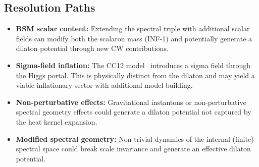 \documentclass[11pt,a4paper]{article}
\theoremstyle{plain}
\theoremstyle{definition}
\begin{document}
\subsection{Resolution Paths}

\begin{itemize}[nosep]
  \item \textbf{BSM scalar content:}
    Extending the spectral triple with additional scalar fields
    can modify both the scalaron mass (INF-1) and potentially
    generate a dilaton potential through new CW contributions.
  \item \textbf{Sigma-field inflation:}
    The CC12 model~\cite{CC12} introduces a sigma field through
    the Higgs portal.  This is physically distinct from the dilaton
    and may yield a viable inflationary sector with additional
    model-building.
  \item \textbf{Non-perturbative effects:}
    Gravitational instantons or non-perturbative spectral geometry
    effects could generate a dilaton potential not captured by the
    heat kernel expansion.
  \item \textbf{Modified spectral geometry:}
    Non-trivial dynamics of the internal (finite) spectral space
    could break scale invariance and generate an effective
    dilaton potential.
\end{itemize}
\end{document}
